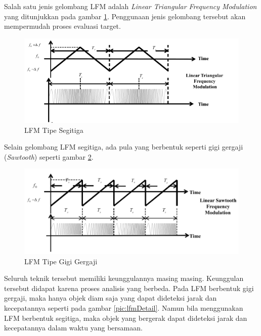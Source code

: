 Salah satu jenis gelombang LFM adalah \textit{Linear Triangular Frequency Modulation} yang ditunjukkan pada gambar \ref{pic:LFMTriangular}. Penggunaan jenis gelombang tersebut akan mempermudah proses evaluasi target.

\begin{figure}
	\begin{center}
		\includegraphics[scale=0.7]{pics/bab2/lfmTriangular.png}
		\caption[LFM Tipe Segitiga]{LFM Tipe Segitiga \cite{Jankiraman2018}}
		\label{pic:LFMTriangular}
	\end{center}
\end{figure}


Selain gelombang LFM segitiga, ada pula yang berbentuk seperti gigi gergaji (\textit{Sawtooth}) seperti gambar \ref{pic:lfmSaw}.

\begin{figure}
	\begin{center}
		\includegraphics[scale=0.65]{pics/bab2/lfmSawtooth.png}
		\caption[LFM Tipe Gigi Gergaji]{LFM Tipe Gigi Gergaji \cite{Jankiraman2018}}
		\label{pic:lfmSaw}
	\end{center}
\end{figure}

Seluruh teknik tersebut memiliki keunggulannya masing masing. Keunggulan tersebut didapat karena proses analisis yang berbeda. Pada LFM berbentuk gigi gergaji, maka hanya objek diam saja yang dapat dideteksi jarak dan kecepatannya seperti pada gambar \ref{pic:lfmDetail}. Namun bila menggunakan LFM berbentuk segitiga, maka objek yang bergerak dapat dideteksi jarak dan kecepatannya dalam waktu yang bersamaan.


